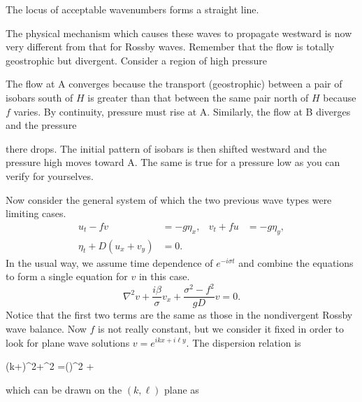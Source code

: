 
\wavefiguremark

The locus of acceptable wavenumbers forms a straight line.

The physical mechanism which causes these waves to propagate westward is now very
different from that for Rossby waves. Remember that the flow is totally geostrophic
but divergent. Consider a region of high pressure


\wavefiguremark

The flow at A converges because the transport (geostrophic) between a pair of isobars
south of $H$ is greater than that between the same pair north of $H$ because $f$ varies.
By continuity, pressure must rise at A. Similarly, the flow at B diverges and the
pressure

\sourcepagebreak

there drops. The initial pattern of isobars is then shifted westward and the pressure
high moves toward A. The same is true for a pressure low as you can verify for
yourselves.

Now consider the general system of which the two previous wave types were limiting
cases.
\begin{align*}
	u_t-fv            & =-g\eta_x,
	                  & v_t+fu     & =-g\eta_y, \\
	\eta_t+D(u_x+v_y) & =0.
\end{align*}
In the usual way, we assume time dependence of $e^{-i\sigma t}$ and combine the
equations to form a single equation for $v$ in this case.
\[
	\nabla^2v+\frac{i\beta}{\sigma}v_x
	+\frac{\sigma^2-f^2}{gD}v=0.
\]
Notice that the first two terms are the same as those in the nondivergent Rossby wave
balance. Now $f$ is not really constant, but we consider it fixed in order to look for
plane wave solutions $v=e^{ikx+i\ell y}$. The dispersion relation is
\begin{waveequation}
	\left(k+\frac{\beta}{2\sigma}\right)^2+\ell^2
	=\left(\frac{\beta}{2\sigma}\right)^2
	+
\end{waveequation}
which can be drawn on the $(k,\ell)$ plane as

\sourcepagebreak


